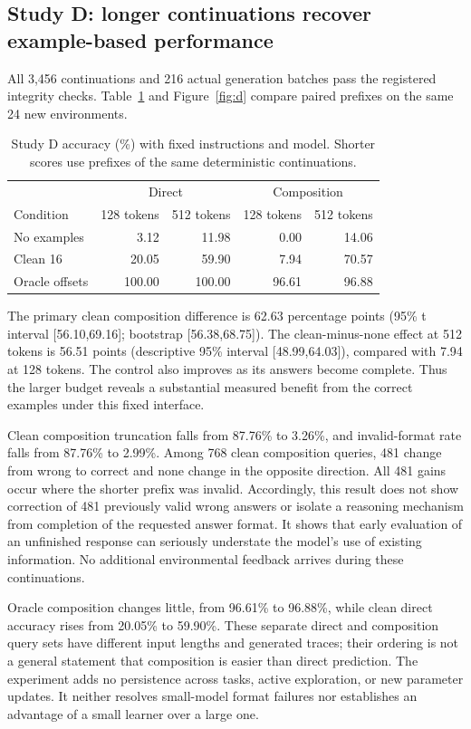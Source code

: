 \documentclass[11pt]{article}
\begin{document}
\subsection{Study D: longer continuations recover example-based performance}
All 3,456 continuations and 216 actual generation batches pass the registered
integrity checks. Table~\ref{tab:d} and Figure~\ref{fig:d} compare paired
prefixes on the same 24 new environments.

\begin{table}[htbp]
\centering\small
\begin{tabular}{lrrrr}
\toprule
& \multicolumn{2}{c}{Direct} & \multicolumn{2}{c}{Composition} \\
Condition & 128 tokens & 512 tokens & 128 tokens & 512 tokens \\
\midrule
No examples & 3.12 & 11.98 & 0.00 & 14.06 \\
Clean 16 & 20.05 & 59.90 & 7.94 & 70.57 \\
Oracle offsets & 100.00 & 100.00 & 96.61 & 96.88 \\
\bottomrule
\end{tabular}
\caption{Study D accuracy (\%) with fixed instructions and model. Shorter
scores use prefixes of the same deterministic continuations.}
\label{tab:d}
\end{table}

The primary clean composition difference is 62.63 percentage points (95\% t
interval [56.10,69.16]; bootstrap [56.38,68.75]). The clean-minus-none effect
at 512 tokens is 56.51 points (descriptive 95\% interval [48.99,64.03]),
compared with 7.94 at 128 tokens. The control also improves as its answers
become complete. Thus the larger budget reveals a substantial measured benefit
from the correct examples under this fixed interface.

Clean composition truncation falls from 87.76\% to 3.26\%, and invalid-format
rate falls from 87.76\% to 2.99\%. Among 768 clean composition queries, 481
change from wrong to correct and none change in the opposite direction. All
481 gains occur where the shorter prefix was invalid. Accordingly, this result
does not show correction of 481 previously valid wrong answers or isolate a
reasoning mechanism from completion of the requested answer format. It shows
that early evaluation of an unfinished response can seriously understate the
model's use of existing information. No additional environmental feedback
arrives during these continuations.

Oracle composition changes little, from 96.61\% to 96.88\%, while clean direct
accuracy rises from 20.05\% to 59.90\%. These separate direct and composition
query sets have different input lengths and generated traces; their ordering
is not a general statement that composition is easier than direct prediction.
The experiment adds no persistence across tasks, active exploration, or new
parameter updates. It neither resolves small-model format failures nor
establishes an advantage of a small learner over a large one.
\end{document}

